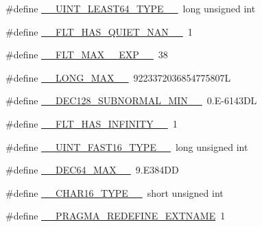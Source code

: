 \begin{DoxyCompactItemize}
\item 
\#define \hyperlink{build-analizer__host-_desktop___qt__5__9__0___g_c_c__64bit-_release_2moc__predefs_8h_a306a0b7c6f110b24a77083abaf3acc7a}{\+\_\+\+\_\+\+U\+I\+N\+T\+\_\+\+L\+E\+A\+S\+T64\+\_\+\+T\+Y\+P\+E\+\_\+\+\_\+}~long unsigned int
\item 
\#define \hyperlink{build-analizer__host-_desktop___qt__5__9__0___g_c_c__64bit-_release_2moc__predefs_8h_acb3a3a30075a9589b520df3b329df29e}{\+\_\+\+\_\+\+F\+L\+T\+\_\+\+H\+A\+S\+\_\+\+Q\+U\+I\+E\+T\+\_\+\+N\+A\+N\+\_\+\+\_\+}~1
\item 
\#define \hyperlink{build-analizer__host-_desktop___qt__5__9__0___g_c_c__64bit-_release_2moc__predefs_8h_a3641a65e329884d817848ba5d6163f07}{\+\_\+\+\_\+\+F\+L\+T\+\_\+\+M\+A\+X\+\_\+\_\+\+E\+X\+P\+\_\+\+\_\+}~38
\item 
\#define \hyperlink{build-analizer__host-_desktop___qt__5__9__0___g_c_c__64bit-_release_2moc__predefs_8h_af16678d7537c7a5463c807639fe2f635}{\+\_\+\+\_\+\+L\+O\+N\+G\+\_\+\+M\+A\+X\+\_\+\+\_\+}~9223372036854775807\+L
\item 
\#define \hyperlink{build-analizer__host-_desktop___qt__5__9__0___g_c_c__64bit-_release_2moc__predefs_8h_a63678ee519e34f99b61f3aeb5ff2cd75}{\+\_\+\+\_\+\+D\+E\+C128\+\_\+\+S\+U\+B\+N\+O\+R\+M\+A\+L\+\_\+\+M\+I\+N\+\_\+\+\_\+}~0.\+E-\/6143\+D\+L
\item 
\#define \hyperlink{build-analizer__host-_desktop___qt__5__9__0___g_c_c__64bit-_release_2moc__predefs_8h_a658d9ba84d429e748ce5f1905732c962}{\+\_\+\+\_\+\+F\+L\+T\+\_\+\+H\+A\+S\+\_\+\+I\+N\+F\+I\+N\+I\+T\+Y\+\_\+\+\_\+}~1
\item 
\#define \hyperlink{build-analizer__host-_desktop___qt__5__9__0___g_c_c__64bit-_release_2moc__predefs_8h_a5aed2c2843dad661012dac2d465f89e1}{\+\_\+\+\_\+\+U\+I\+N\+T\+\_\+\+F\+A\+S\+T16\+\_\+\+T\+Y\+P\+E\+\_\+\+\_\+}~long unsigned int
\item 
\#define \hyperlink{build-analizer__host-_desktop___qt__5__9__0___g_c_c__64bit-_release_2moc__predefs_8h_a06608084919123d90621d715daf1f456}{\+\_\+\+\_\+\+D\+E\+C64\+\_\+\+M\+A\+X\+\_\+\+\_\+}~9.\+E384\+D\+D
\item 
\#define \hyperlink{build-analizer__host-_desktop___qt__5__9__0___g_c_c__64bit-_release_2moc__predefs_8h_a95b91b7560e936fdc4ce441d38b94b3e}{\+\_\+\+\_\+\+C\+H\+A\+R16\+\_\+\+T\+Y\+P\+E\+\_\+\+\_\+}~short unsigned int
\item 
\#define \hyperlink{build-analizer__host-_desktop___qt__5__9__0___g_c_c__64bit-_release_2moc__predefs_8h_a165bf2f00e518485a1bb58c1918205b0}{\+\_\+\+\_\+\+P\+R\+A\+G\+M\+A\+\_\+\+R\+E\+D\+E\+F\+I\+N\+E\+\_\+\+E\+X\+T\+N\+A\+M\+E}~1

\end{DoxyCompactItemize}
